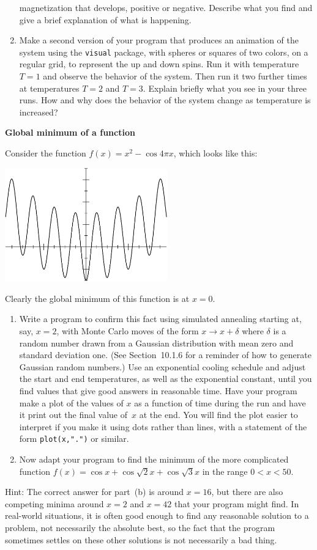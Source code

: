\documentclass[12pt]{article}
\begin{document}
\begin{exercises}
\begin{enumerate}
  magnetization that develops, positive or negative.  Describe what you
  find and give a brief explanation of what is happening.
\item Make a second version of your program that produces an animation of
  the system using the \verb|visual| package, with spheres or squares of
  two colors, on a regular grid, to represent the up and down spins.  Run
  it with temperature~$T=1$ and observe the behavior of the system.  Then
  run it two further times at temperatures $T=2$ and $T=3$.  Explain
  briefly what you see in your three runs.  How and why does the behavior
  of the system change as temperature is increased?
\end{enumerate}



\exercise \textbf{Global minimum of a function}

\exskip Consider the function $f(x) = x^2 -
\cos 4\pi x$, which looks like this:
\bigskip
\begin{center}
\includegraphics[width=7cm]{safx.eps}
\end{center}
Clearly the global minimum of this function is at $x=0$.
\begin{enumerate}\setlength{\itemsep}{0pt}
\item Write a program to confirm this fact using simulated annealing
  starting at, say, $x=2$, with Monte Carlo moves of the form $x\to
  x+\delta$ where $\delta$ is a random number drawn from a Gaussian
  distribution with mean zero and standard deviation one.  (See
  Section~10.1.6 for a reminder of how to generate Gaussian random
  numbers.)  Use an exponential cooling schedule and adjust the start and
  end temperatures, as well as the exponential constant, until you find
  values that give good answers in reasonable time.  Have your program make
  a plot of the values of $x$ as a function of time during the run and have
  it print out the final value of~$x$ at the end.  You will find the plot
  easier to interpret if you make it using dots rather than lines, with a
  statement of the form \verb|plot(x,".")| or similar.
\item Now adapt your program to find the minimum of the more complicated
  function $f(x) = \cos x + \cos \sqrt2x + \cos \sqrt3 x$ in the range
  $0<x<50$.
\end{enumerate}
Hint: The correct answer for part~(b) is around $x=16$, but there are also
competing minima around $x=2$ and $x=42$ that your program might find.  In
real-world situations, it is often good enough to find any reasonable
solution to a problem, not necessarily the absolute best, so the fact that
the program sometimes settles on these other solutions is not necessarily a
bad thing.



\end{exercises}
\end{document}
